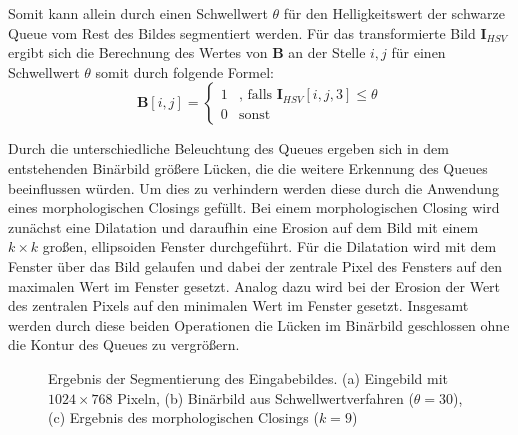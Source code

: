 Somit kann allein durch einen Schwellwert $\theta$ für den Helligkeitswert der schwarze Queue vom Rest des Bildes segmentiert werden.
Für das transformierte Bild $\textbf{I}_{HSV}$ ergibt sich die Berechnung des Wertes von $\textbf{B}$ an der Stelle $i, j$ für einen Schwellwert $\theta$ somit durch folgende Formel:
\begin{equation*}
\textbf{B}[i,j] = \begin{cases}
1 &\text{, falls $\textbf{I}_{HSV}[i, j, 3] \leq \theta$}\\
0 &\text{sonst}
\end{cases}
\end{equation*}

Durch die unterschiedliche Beleuchtung des Queues ergeben sich in dem entstehenden Binärbild größere Lücken, die die weitere Erkennung des Queues beeinflussen würden.
Um dies zu verhindern werden diese durch die Anwendung eines morphologischen Closings gefüllt.
Bei einem morphologischen Closing wird zunächst eine Dilatation und daraufhin eine Erosion auf dem Bild mit einem $k \times k$ großen, ellipsoiden Fenster durchgeführt. 
Für die Dilatation wird mit dem Fenster über das Bild gelaufen und dabei der zentrale Pixel des Fensters auf den maximalen Wert im Fenster gesetzt.
Analog dazu wird bei der Erosion der Wert des zentralen Pixels auf den minimalen Wert im Fenster gesetzt.
Insgesamt werden durch diese beiden Operationen die Lücken im Binärbild geschlossen ohne die Kontur des Queues zu vergrößern.

\begin{figure}[H]
	\label{fig:thresholded}
	\centering
	\caption{Ergebnis der Segmentierung des Eingabebildes. (a) Eingebild mit $1024 \times 768$ Pixeln, (b) Binärbild aus Schwellwertverfahren ($\theta = 30$),  (c) Ergebnis des morphologischen Closings ($k=9$)}
\end{figure}

